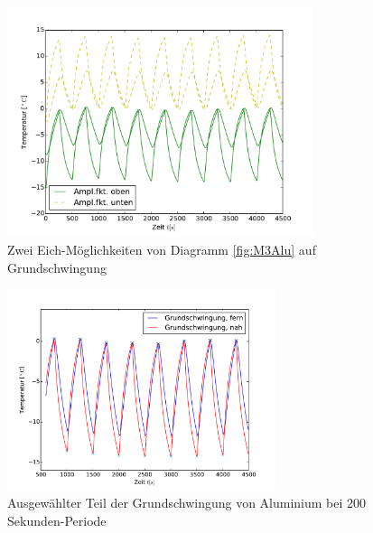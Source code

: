 \begin{figure}[h!]
	\centering
	\includegraphics[width=0.8\textwidth]{Bilder/Normierungsauswahl/M3_Messing_norm.pdf}
	\caption{Zwei Eich-Möglichkeiten von Diagramm \ref{fig:M3Alu} auf Grundschwingung}
	\label{fig:M3AluNorm}
\end{figure}
\begin{figure}[h!]
	\centering
	\includegraphics[width=0.7\textwidth]{Bilder/M3_Alu_norm.pdf}
	\caption{Ausgewählter Teil der Grundschwingung von Aluminium bei 200 Sekunden-Periode}
	\label{fig:M3AluNormkurve}
\end{figure}
